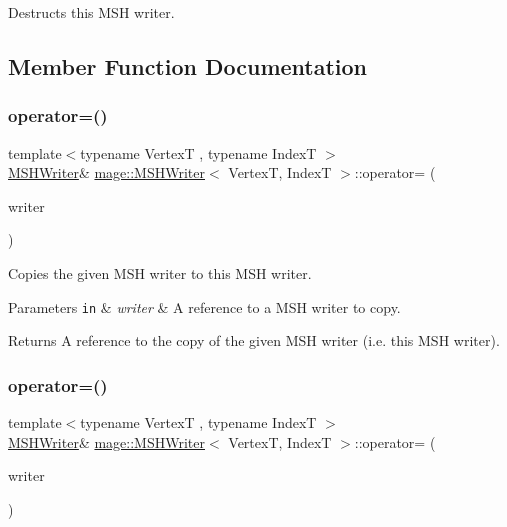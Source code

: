 Destructs this M\+SH writer. 

\subsection{Member Function Documentation}
\hypertarget{classmage_1_1_m_s_h_writer_a0c4f9bbd4a62ef60a38b7a75eb21ea26}{}\label{classmage_1_1_m_s_h_writer_a0c4f9bbd4a62ef60a38b7a75eb21ea26} 
\subsubsection{\texorpdfstring{operator=()}{operator=()}\hspace{0.1cm}{\footnotesize\ttfamily [1/2]}}
{\footnotesize\ttfamily template$<$typename VertexT , typename IndexT $>$ \\
\hyperlink{classmage_1_1_m_s_h_writer}{M\+S\+H\+Writer}\& \hyperlink{classmage_1_1_m_s_h_writer}{mage\+::\+M\+S\+H\+Writer}$<$ VertexT, IndexT $>$\+::operator= (\begin{DoxyParamCaption}\item[{const \hyperlink{classmage_1_1_m_s_h_writer}{M\+S\+H\+Writer}$<$ VertexT, IndexT $>$ \&}]{writer }\end{DoxyParamCaption})\hspace{0.3cm}{\ttfamily [delete]}}

Copies the given M\+SH writer to this M\+SH writer.


\begin{DoxyParams}[1]{Parameters}
\mbox{\tt in}  & {\em writer} & A reference to a M\+SH writer to copy. \\
\hline
\end{DoxyParams}
\begin{DoxyReturn}{Returns}
A reference to the copy of the given M\+SH writer (i.\+e. this M\+SH writer). 
\end{DoxyReturn}
\hypertarget{classmage_1_1_m_s_h_writer_ad8c9302c6335684ea28d4e47c81a1afb}{}\label{classmage_1_1_m_s_h_writer_ad8c9302c6335684ea28d4e47c81a1afb} 
\subsubsection{\texorpdfstring{operator=()}{operator=()}\hspace{0.1cm}{\footnotesize\ttfamily [2/2]}}
{\footnotesize\ttfamily template$<$typename VertexT , typename IndexT $>$ \\
\hyperlink{classmage_1_1_m_s_h_writer}{M\+S\+H\+Writer}\& \hyperlink{classmage_1_1_m_s_h_writer}{mage\+::\+M\+S\+H\+Writer}$<$ VertexT, IndexT $>$\+::operator= (\begin{DoxyParamCaption}\item[{\hyperlink{classmage_1_1_m_s_h_writer}{M\+S\+H\+Writer}$<$ VertexT, IndexT $>$ \&\&}]{writer }\end{DoxyParamCaption})\hspace{0.3cm}{\ttfamily [delete]}}

